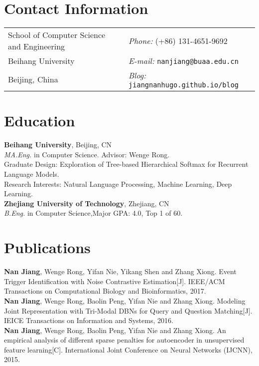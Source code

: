 \documentclass[margin,line]{resume}
\begin{document}

\begin{resume}
\section{Contact Information}
\begin{tabular}{@{}p{3in}p{3in}}
School of Computer Science and Engineering & {\it Phone:}  (+86) 131-4651-9692 \\
Beihang University                         & {\it E-mail:}  {\tt nanjiang@buaa.edu.cn} \\
Beijing, China                             & {\it Blog:} {\tt jiangnanhugo.github.io/blog} \\
\end{tabular}


\section{Education}
{\bf Beihang University}, Beijing,  CN\\
\emph{MA.Eng.} in Computer Science. Advisor: Wenge Rong.\\
Graduate Design: Exploration of Tree-based Hierarchical Softmax for Recurrent Language Models. \\
Research Interests: Natural Language Processing, Machine Learning, Deep Learning. \\

{\bf Zhejiang University of Technology}, Zhejiang, CN\\
\emph{B.Eng.} in Computer Science,\space Major GPA: 4.0, Top 1 of 60.




\section{Publications}
\textbf{Nan Jiang}, Wenge Rong, Yifan Nie, Yikang Shen and Zhang Xiong. Event Trigger Identification with Noise Contrastive Estimation[J]. IEEE/ACM Transactions on Computational Biology and Bioinformatics, 2017.\\

\textbf{Nan Jiang}, Wenge Rong, Baolin Peng, Yifan Nie and Zhang Xiong. Modeling Joint Representation with Tri-Modal DBNs for Query and Question Matching[J]. IEICE Transactions on Information and Systems, 2016.\\

\textbf{Nan Jiang}, Wenge Rong, Baolin Peng, Yifan Nie and Zhang Xiong. An empirical analysis of different sparse penalties for autoencoder in unsupervised feature learning[C]. International Joint Conference on Neural Networks (IJCNN), 2015.\\


\end{resume}
\end{document}
